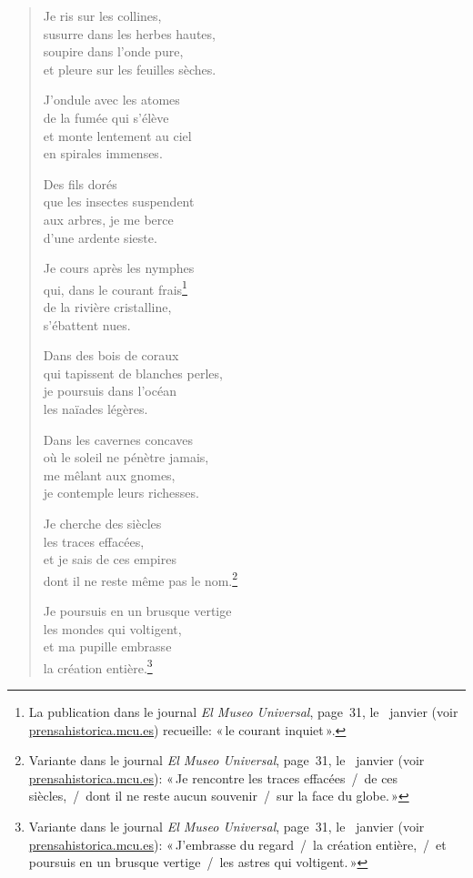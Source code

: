 \begin{verse}
  Je ris sur les collines, \\
  susurre dans les herbes hautes, \\
  soupire dans l'onde pure, \\
  et pleure sur les feuilles sèches.

  J'ondule avec les atomes \\
  de la fumée qui s'élève \\
  et monte lentement au ciel \\
  en spirales immenses.

  Des fils dorés \\
  que les insectes suspendent \\
  aux arbres, je me berce \\
  d'une ardente sieste.

  Je cours après les nymphes \\
  qui, dans le courant frais\footnote{La publication dans
le journal \emph{El Museo Universal}, page~31, le~ janvier 
(voir \url{prensahistorica.mcu.es}) recueille: «\,le courant inquiet\,».} \\
  de la rivière cristalline, \\
  s'ébattent nues.

  Dans des bois de coraux \\
  qui tapissent de blanches perles, \\
  je poursuis dans l'océan \\
  les naïades légères.

  Dans les cavernes concaves \\
  où le soleil ne pénètre jamais, \\
  me mêlant aux gnomes, \\
  je contemple leurs richesses.

  Je cherche des siècles \\
  les traces effacées, \\
  et je sais de ces empires \\
  dont il ne reste même pas le nom.\footnote{Variante dans le journal
  \emph{El Museo Universal}, page~31, le~ janvier  (voir
  \url{prensahistorica.mcu.es}): «\,Je rencontre les traces effacées~/~de ces siècles,~/~dont il ne reste aucun souvenir~/~sur la face du globe.\,»}

  Je poursuis en un brusque vertige \\
  les mondes qui voltigent, \\
  et ma pupille embrasse \\
  la création entière.\footnote{Variante dans le journal
  \emph{El Museo Universal}, page~31, le~ janvier  (voir
  \url{prensahistorica.mcu.es}): «\,J'embrasse du regard~/~la création
  entière,~/~et poursuis en un brusque vertige~/~les astres qui voltigent.\,»}


\end{verse}
